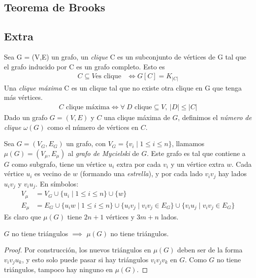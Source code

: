 \subsection{Teorema de Brooks}



\subsection{Extra}
\begin{definition}
Sea G = (V,E) un grafo, un \emph{clique} C es un subconjunto de vértices de G tal que el grafo inducido por C es un grafo completo. Esto es 
\begin{align}
    C \subseteq V \text{es clique} &\iff G[C] = K_{|C|}
\end{align}
Una \emph{clique máxima} C es un clique tal que no existe otra clique en G que tenga más vértices. \begin{align}
    C \text{ clique máxima} \iff \forall~ D \text{ clique} \subseteq V,~ |D| \le |C|
\end{align}
Dado un grafo $G = (V,E)$ y $C$ una clique máxima de $G$, definimos el \emph{número de clique} $\omega(G)$ como el número de vértices en $C$.
\end{definition}

\begin{definition}
Sea $G = (V_G, E_G)$ un grafo, con $V_G = \{v_i \mid 1 \le i \le n\}$, llamamos $\mu(G) = (V_\mu, E_\mu)$ al \emph{grafo de Mycielski} de $G$. Este grafo es tal que contiene a $G$ como subgrafo, tiene un vértice $u_i$ extra por cada $v_i$ y un vértice extra $w$. Cada vértice $u_i$ es vecino de $w$ (formando una \emph{estrella}), y por cada lado $v_iv_j$ hay lados $u_iv_j$ y $v_iu_j$.
En símbolos:
\begin{align}
V_\mu &= V_G \cup \{u_i \mid 1 \le i \le n \} \cup \{w\}\\
E_\mu &= E_G \cup \{ u_i w \mid 1 \le i \le n\} \cup \{u_i v_j \mid v_i v_j \in E_G \} \cup \{v_i u_j \mid v_i v_j \in E_G \}
\end{align}
Es claro que $\mu(G)$ tiene $2n+1$ vértices y $3m+n$ lados.
\end{definition}
\begin{proposition}\label{Mycielski_triangle_free}
$G$ no tiene triángulos $\implies$ $\mu(G)$ no tiene triángulos.
\end{proposition}
\begin{proof}
Por construcción, los nuevos triángulos en $\mu(G)$ deben ser de la forma $v_i v_j u_k$, y esto solo puede pasar si hay triángulos $v_i v_j v_k$ en $G$. Como $G$ no tiene triángulos, tampoco hay ninguno en $\mu(G)$.
\end{proof}

